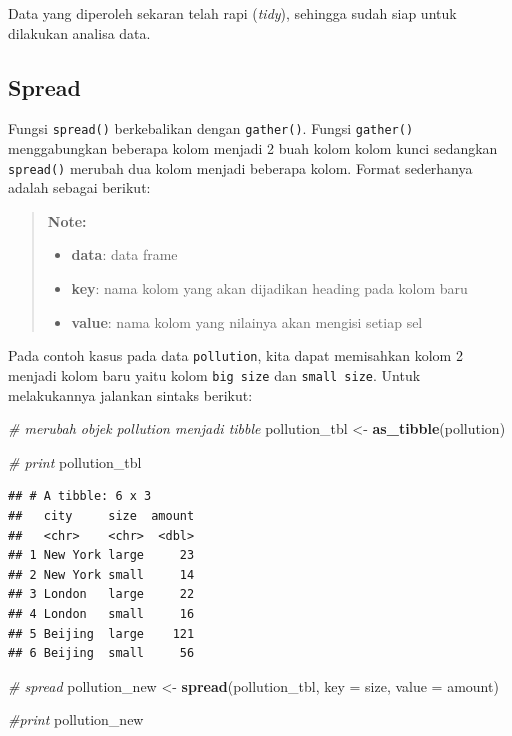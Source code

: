 \documentclass[]{book}
\newenvironment{Shaded}{\begin{snugshade}}{\end{snugshade}}
\newcommand{\KeywordTok}[1]{\textcolor[rgb]{0.13,0.29,0.53}{\textbf{#1}}}
\newcommand{\DataTypeTok}[1]{\textcolor[rgb]{0.13,0.29,0.53}{#1}}
\newcommand{\StringTok}[1]{\textcolor[rgb]{0.31,0.60,0.02}{#1}}
\newcommand{\CommentTok}[1]{\textcolor[rgb]{0.56,0.35,0.01}{\textit{#1}}}
\newcommand{\NormalTok}[1]{#1}
\providecommand{\tightlist}{%
  \setlength{\itemsep}{0pt}\setlength{\parskip}{0pt}}
\begin{document}
Data yang diperoleh sekaran telah rapi (\emph{tidy}), sehingga sudah
siap untuk dilakukan analisa data.

\subsection{Spread}\label{spread}

Fungsi \texttt{spread()} berkebalikan dengan \texttt{gather()}. Fungsi
\texttt{gather()} menggabungkan beberapa kolom menjadi 2 buah kolom
kolom kunci sedangkan \texttt{spread()} merubah dua kolom menjadi
beberapa kolom. Format sederhanya adalah sebagai berikut:

\begin{quote}
\textbf{Note: }

\begin{itemize}
\tightlist
\item
  \textbf{data}: data frame
\item
  \textbf{key}: nama kolom yang akan dijadikan heading pada kolom baru
\item
  \textbf{value}: nama kolom yang nilainya akan mengisi setiap sel
\end{itemize}
\end{quote}

Pada contoh kasus pada data \texttt{pollution}, kita dapat memisahkan
kolom 2 menjadi kolom baru yaitu kolom \texttt{big\ size} dan
\texttt{small\ size}. Untuk melakukannya jalankan sintaks berikut:

\begin{Shaded}
\begin{Highlighting}[]
\CommentTok{# merubah objek pollution menjadi tibble}
\NormalTok{pollution_tbl <-}\StringTok{ }\KeywordTok{as_tibble}\NormalTok{(pollution)}

\CommentTok{# print}
\NormalTok{pollution_tbl}
\end{Highlighting}
\end{Shaded}

\begin{verbatim}
## # A tibble: 6 x 3
##   city     size  amount
##   <chr>    <chr>  <dbl>
## 1 New York large     23
## 2 New York small     14
## 3 London   large     22
## 4 London   small     16
## 5 Beijing  large    121
## 6 Beijing  small     56
\end{verbatim}

\begin{Shaded}
\begin{Highlighting}[]
\CommentTok{# spread}
\NormalTok{pollution_new <-}\StringTok{ }\KeywordTok{spread}\NormalTok{(pollution_tbl,}
                        \DataTypeTok{key =}\NormalTok{ size,}
                        \DataTypeTok{value =}\NormalTok{ amount)}

\CommentTok{#print}
\NormalTok{pollution_new}
\end{Highlighting}
\end{Shaded}
\end{document}
